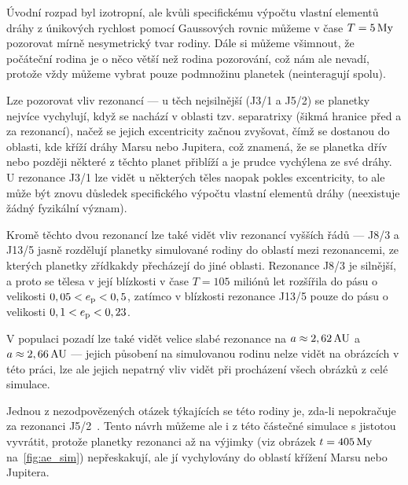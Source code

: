 \documentclass[A4paper, 12pt, oneside]{book}
\begin{document}
Úvodní rozpad byl izotropní, ale kvůli specifickému výpočtu vlastní elementů dráhy z únikových rychlost pomocí Gaussových rovnic můžeme v čase $T=5\,{\rm My}$ pozorovat mírně nesymetrický tvar rodiny. Dále si můžeme všimnout, že počáteční rodina je o něco větší než rodina pozorování, což nám ale nevadí, protože vždy můžeme vybrat pouze podmnožinu planetek (neinteragují spolu). 

Lze pozorovat vliv rezonancí --- u těch nejsilnější (J3/1 a J5/2) se planetky nejvíce vychylují, když se nachází v oblasti tzv. separatrixy (šikmá hranice před a za rezonancí), načež se jejich excentricity začnou zvyšovat, čímž se dostanou do oblasti, kde kříží dráhy Marsu nebo Jupitera, což znamená, že se planetka dřív nebo později některé z těchto planet přiblíží a je prudce vychýlena ze své dráhy. U rezonance J3/1 lze vidět u některých těles naopak pokles excentricity, to ale může být znovu důsledek specifického výpočtu vlastní elementů dráhy (neexistuje žádný fyzikální význam). 

Kromě těchto dvou rezonancí lze také vidět vliv rezonancí vyšších řádů --- J8/3 a J13/5 jasně rozdělují planetky simulované rodiny do oblastí mezi rezonancemi, ze kterých planetky zřídkakdy přecházejí do jiné oblasti. Rezonance J8/3 je silnější, a proto se tělesa v její blízkosti v čase $T=105$ miliónů let rozšířila do pásu o velikosti $0,05<e_{\rm p}<0,5$, zatímco v blízkosti rezonance J13/5 pouze do pásu o velikosti $0,1<e_{\rm p}<0,23$.

V populaci pozadí lze také vidět velice slabé rezonance na $a\approx2,62\,{\rm AU}$ a $a\approx2,66\,{\rm AU}$ --- jejich působení na simulovanou rodinu nelze vidět na obrázcích v této práci, lze ale jejich nepatrný vliv vidět při procházení všech obrázků z celé simulace.

Jednou z nezodpovězených otázek týkajících se této rodiny je, zda-li nepokračuje za rezonanci J5/2~\cite{nesvorny15}. Tento návrh můžeme ale i z této částečné simulace s jistotou vyvrátit, protože planetky rezonanci až na výjimky (viz obrázek $t=405\,{\rm My}$ na~\ref{fig:ae_sim}) nepřeskakují, ale jí vychylovány do oblastí křížení Marsu nebo Jupitera. 
\end{document}
